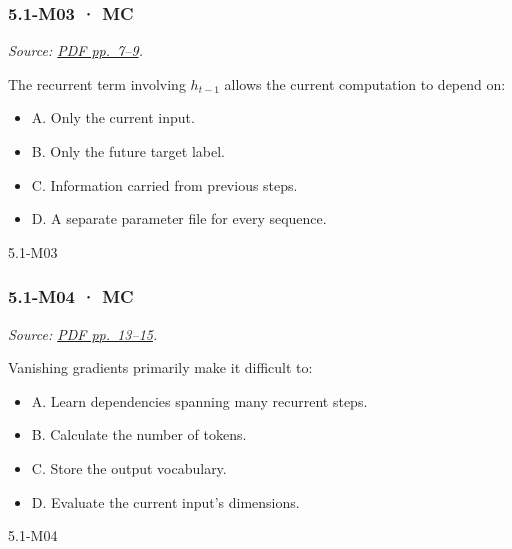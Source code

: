 \noindent\begin{minipage}{\linewidth}

\subsubsection{5.1-M03 · MC}\label{m03-mc-12}

\emph{Source:
\href{../Lecture\%20Slides/5.1.\%20Sequence\%20Models.pdf\#page=7}{PDF
pp.~7--9}.}

The recurrent term involving \(h_{t-1}\) allows the current computation
to depend on:

\begin{itemize}
\tightlist
\item
  A. Only the current input.
\item
  B. Only the future target label.
\item
  C. Information carried from previous steps.
\item
  D. A separate parameter file for every sequence.
\end{itemize}

\begin{solution}[8mm]{5.1-M03}

\end{solution}
\end{minipage}\par\medskip

\noindent\begin{minipage}{\linewidth}

\subsubsection{5.1-M04 · MC}\label{m04-mc-12}

\emph{Source:
\href{../Lecture\%20Slides/5.1.\%20Sequence\%20Models.pdf\#page=13}{PDF
pp.~13--15}.}

Vanishing gradients primarily make it difficult to:

\begin{itemize}
\tightlist
\item
  A. Learn dependencies spanning many recurrent steps.
\item
  B. Calculate the number of tokens.
\item
  C. Store the output vocabulary.
\item
  D. Evaluate the current input's dimensions.
\end{itemize}

\begin{solution}[8mm]{5.1-M04}

\end{solution}
\end{minipage}\par\medskip


